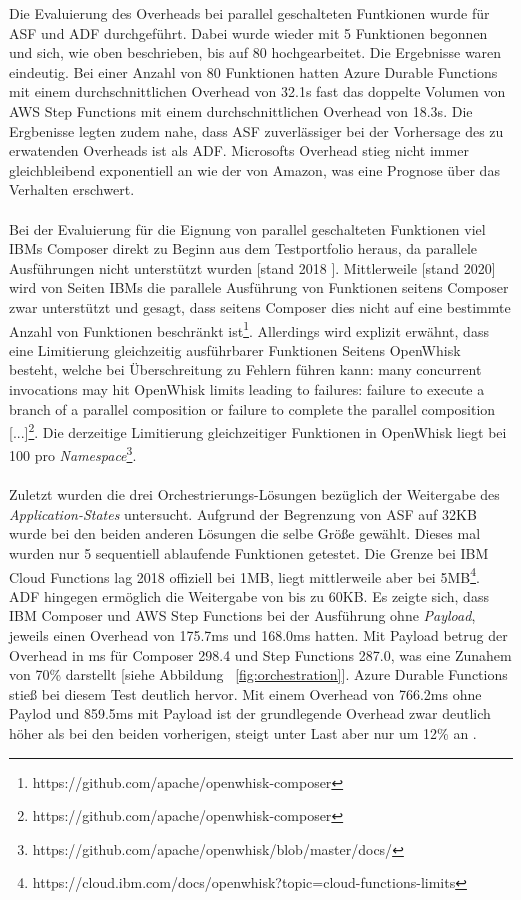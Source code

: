 \documentclass[11pt]{article}
\begin{document}
Die Evaluierung des Overheads bei parallel geschalteten Funtkionen wurde für ASF und ADF durchgeführt. Dabei wurde wieder mit 5 Funktionen begonnen und sich, wie oben beschrieben, bis auf 80 hochgearbeitet. Die Ergebnisse waren eindeutig. Bei einer Anzahl von 80 Funktionen hatten Azure Durable Functions mit einem durchschnittlichen Overhead von 32.1s fast das doppelte Volumen von AWS Step Functions mit einem durchschnittlichen Overhead von 18.3s. Die Ergbenisse legten zudem nahe, dass ASF zuverlässiger bei der Vorhersage des zu erwatenden Overheads ist als ADF. Microsofts Overhead stieg nicht immer gleichbleibend exponentiell an wie der von Amazon, was eine Prognose über das Verhalten erschwert.\\\\
Bei der Evaluierung für die Eignung von parallel geschalteten Funktionen viel IBMs Composer direkt zu Beginn aus dem Testportfolio heraus, da parallele Ausführungen nicht unterstützt wurden [stand 2018 \cite{lopez2018comparison}]. Mittlerweile [stand 2020] wird von Seiten IBMs die parallele Ausführung von Funktionen seitens Composer zwar unterstützt und gesagt, dass seitens Composer dies nicht auf eine bestimmte Anzahl von Funktionen beschränkt ist\footnote{https://github.com/apache/openwhisk-composer}. Allerdings wird explizit erwähnt, dass eine Limitierung gleichzeitig ausführbarer Funktionen Seitens OpenWhisk besteht, welche bei Überschreitung zu Fehlern führen kann: \glqq [...] many concurrent invocations may hit OpenWhisk limits leading to failures: failure to execute a branch of a parallel composition or failure to complete the parallel composition [...]\grqq{}\footnote{https://github.com/apache/openwhisk-composer}. Die derzeitige Limitierung gleichzeitiger Funktionen in OpenWhisk liegt bei 100 pro \textit{Namespace}\footnote{https://github.com/apache/openwhisk/blob/master/docs/}. \\\\
Zuletzt wurden die drei Orchestrierungs-Lösungen bezüglich der Weitergabe des \textit{Application-States} untersucht. Aufgrund der Begrenzung von ASF auf 32KB wurde bei den beiden anderen Lösungen die selbe Größe gewählt. Dieses mal wurden nur 5 sequentiell ablaufende Funktionen getestet. Die Grenze bei IBM Cloud Functions lag 2018 offiziell bei 1MB, liegt mittlerweile aber bei 5MB\footnote{https://cloud.ibm.com/docs/openwhisk?topic=cloud-functions-limits}. ADF hingegen ermöglich die Weitergabe von bis zu 60KB. Es zeigte sich, dass IBM Composer und AWS Step Functions bei der Ausführung ohne \textit{Payload}, jeweils einen Overhead von 175.7ms und 168.0ms hatten. Mit Payload betrug der Overhead in ms für Composer 298.4 und Step Functions 287.0, was eine Zunahem von 70\% darstellt [siehe Abbildung ~\ref{fig:orchestration}]. Azure Durable Functions stieß bei diesem Test deutlich hervor. Mit einem Overhead von 766.2ms ohne Paylod und 859.5ms mit Payload ist der grundlegende Overhead zwar deutlich höher als bei den beiden vorherigen, steigt unter Last aber nur um 12\% an \cite{lopez2018comparison}.
\end{document}
